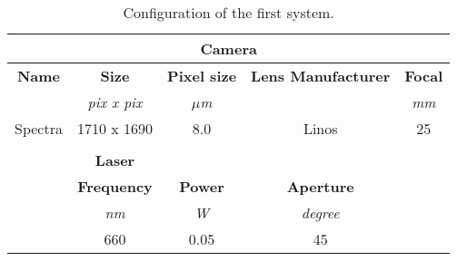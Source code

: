 \begin{table}[h!]
  \centering

  \begin{tabular}{ccccc}
    \hline
    \multicolumn{5}{|c|}{\textbf{Camera}}                                                                                                                                                                            \\ \hline
    \multicolumn{1}{|c|}{\textbf{Name}} & \multicolumn{1}{c|}{\textbf{Size}}      & \multicolumn{1}{c|}{\textbf{Pixel size}} & \multicolumn{1}{c|}{\textbf{Lens Manufacturer}} & \multicolumn{1}{c|}{\textbf{Focal}} \\ \hline
    \multicolumn{1}{|l|}{}              & \multicolumn{1}{c|}{\textit{pix x pix}} & \multicolumn{1}{c|}{\textit{$\mu$m}}        & \multicolumn{1}{c|}{}                           & \multicolumn{1}{c|}{\textit{mm}}    \\ \hline
    \multicolumn{1}{|l|}{Spectra}       & \multicolumn{1}{c|}{1710 x 1690}        & \multicolumn{1}{c|}{8.0}                 & \multicolumn{1}{c|}{Linos}                      & \multicolumn{1}{c|}{25}             \\ \hline
    \multicolumn{1}{l}{}                & \multicolumn{1}{l}{}                    & \multicolumn{1}{l}{}                     & \multicolumn{1}{l}{}                            & \multicolumn{1}{l}{}                \\ \cline{2-4}
    \multicolumn{1}{c|}{}               & \multicolumn{1}{c|}{\textbf{Laser}}     & \multicolumn{1}{c|}{}                    & \multicolumn{1}{c|}{}                           &                                     \\ \cline{2-4}
    \multicolumn{1}{c|}{}               & \multicolumn{1}{c|}{\textbf{Frequency}} & \multicolumn{1}{c|}{\textbf{Power}}      & \multicolumn{1}{c|}{\textbf{Aperture}}          &                                     \\ \cline{2-4}
    \multicolumn{1}{c|}{\textit{}}      & \multicolumn{1}{c|}{\textit{nm}}        & \multicolumn{1}{c|}{\textit{W}}          & \multicolumn{1}{c|}{\textit{degree}}            & \textit{}                           \\ \cline{2-4}
    \multicolumn{1}{c|}{}               & \multicolumn{1}{c|}{660}                & \multicolumn{1}{c|}{0.05}                & \multicolumn{1}{c|}{45}                         &                                     \\ \cline{2-4}
  \end{tabular}
  
  \caption{Configuration of the first system.}
  \label{tab:conf1}
\end{table}